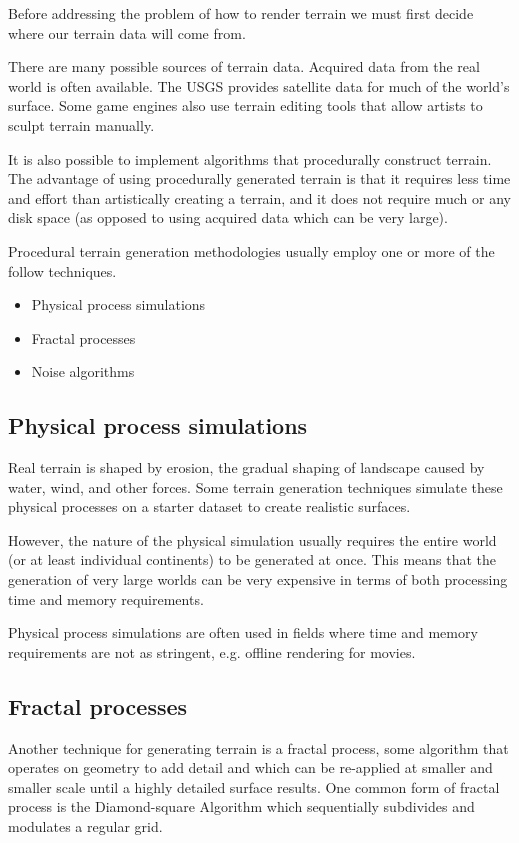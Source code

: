 Before addressing the problem of how to render terrain we must first decide where our terrain data will come from.

There are many possible sources of terrain data.
Acquired data from the real world is often available.
The USGS provides satellite data for much of the world's surface.
Some game engines also use terrain editing tools that allow artists to sculpt terrain manually.

It is also possible to implement algorithms that procedurally construct terrain.
The advantage of using procedurally generated terrain is that it requires less time and effort  than artistically creating a terrain, and it does not require much or any disk space (as opposed to using acquired data which can be very large).

Procedural terrain generation methodologies usually employ one or more of the follow techniques.

\begin{itemize}
\item Physical process simulations
\item Fractal processes
\item Noise algorithms
\end{itemize}

\subsection{Physical process simulations}

Real terrain is shaped by erosion, the gradual shaping of landscape caused by water, wind, and other forces.
Some terrain generation techniques simulate these physical processes on a starter dataset to create realistic surfaces. \cite{hydrology}

However, the nature of the physical simulation usually requires the entire world (or at least individual continents) to be generated at once.
This means that the generation of very large worlds can be very expensive in terms of both processing time and memory requirements.

Physical process simulations are often used in fields where time and memory requirements are not as stringent, e.g. offline rendering for movies.


\subsection{Fractal processes}

Another technique for generating terrain is a fractal process, some algorithm that operates on geometry to add detail and which can be re-applied at smaller and smaller scale until a highly detailed surface results.
One common form of fractal process is the Diamond-square Algorithm which sequentially subdivides and modulates a regular grid.


